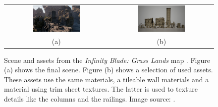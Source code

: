 \begin{figure}
	\centering\small 
	\begin{tabular}{@{}cc@{}}
		\includegraphics[width=0.475\textwidth]{images/07cha_05_pattern_TrimDivinity_1.jpg} &
		\includegraphics[width=0.475\textwidth]{images/07cha_05_pattern_TrimDivinity_02.jpg} \\	
		(a) & (b) \\
	\end{tabular}
	\caption{ 
		Scene and assets from the \emph{Infinity Blade: Grass Lands
		} map \cite{epic2018infinity}. Figure (a) shows the final scene. Figure (b) shows a selection of used assets. These assets use the same materials, a tileable wall materials and a material using trim sheet textures. The latter is used to texture details like the columns and the railings. Image source: \cite{epic2018infinity}.
	}%
	\label{fig:TrimDivinity}
\end{figure}

